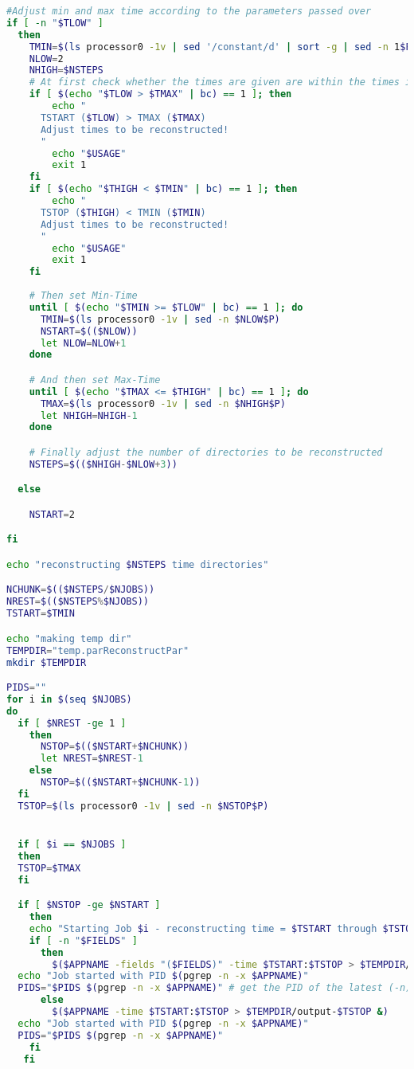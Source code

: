 \begin{lstlisting}[language=bash]
#Adjust min and max time according to the parameters passed over
if [ -n "$TLOW" ]
  then
    TMIN=$(ls processor0 -1v | sed '/constant/d' | sort -g | sed -n 1$P) # now allow the first directory
    NLOW=2
    NHIGH=$NSTEPS
    # At first check whether the times are given are within the times in the directory
    if [ $(echo "$TLOW > $TMAX" | bc) == 1 ]; then
        echo "
      TSTART ($TLOW) > TMAX ($TMAX)
      Adjust times to be reconstructed!
      "
        echo "$USAGE"
        exit 1
    fi
    if [ $(echo "$THIGH < $TMIN" | bc) == 1 ]; then
        echo "
      TSTOP ($THIGH) < TMIN ($TMIN)
      Adjust times to be reconstructed!
      "
        echo "$USAGE"
        exit 1
    fi
  
    # Then set Min-Time
    until [ $(echo "$TMIN >= $TLOW" | bc) == 1 ]; do
      TMIN=$(ls processor0 -1v | sed -n $NLOW$P)
      NSTART=$(($NLOW))
      let NLOW=NLOW+1
    done

    # And then set Max-Time
    until [ $(echo "$TMAX <= $THIGH" | bc) == 1 ]; do
      TMAX=$(ls processor0 -1v | sed -n $NHIGH$P)
      let NHIGH=NHIGH-1
    done

    # Finally adjust the number of directories to be reconstructed
    NSTEPS=$(($NHIGH-$NLOW+3))

  else

    NSTART=2

fi

echo "reconstructing $NSTEPS time directories"

NCHUNK=$(($NSTEPS/$NJOBS))
NREST=$(($NSTEPS%$NJOBS))
TSTART=$TMIN

echo "making temp dir"
TEMPDIR="temp.parReconstructPar"
mkdir $TEMPDIR

PIDS=""
for i in $(seq $NJOBS)
do
  if [ $NREST -ge 1 ]
    then
      NSTOP=$(($NSTART+$NCHUNK))
      let NREST=$NREST-1
    else
      NSTOP=$(($NSTART+$NCHUNK-1))
  fi
  TSTOP=$(ls processor0 -1v | sed -n $NSTOP$P)


  if [ $i == $NJOBS ] 
  then
  TSTOP=$TMAX
  fi

  if [ $NSTOP -ge $NSTART ]
    then  
    echo "Starting Job $i - reconstructing time = $TSTART through $TSTOP"
    if [ -n "$FIELDS" ]
      then
        $($APPNAME -fields "($FIELDS)" -time $TSTART:$TSTOP > $TEMPDIR/output-$TSTOP &)
  echo "Job started with PID $(pgrep -n -x $APPNAME)"
  PIDS="$PIDS $(pgrep -n -x $APPNAME)" # get the PID of the latest (-n) job exactly matching (-x) $APPNAME
      else
        $($APPNAME -time $TSTART:$TSTOP > $TEMPDIR/output-$TSTOP &)
  echo "Job started with PID $(pgrep -n -x $APPNAME)"
  PIDS="$PIDS $(pgrep -n -x $APPNAME)"
    fi
   fi


\end{lstlisting}
